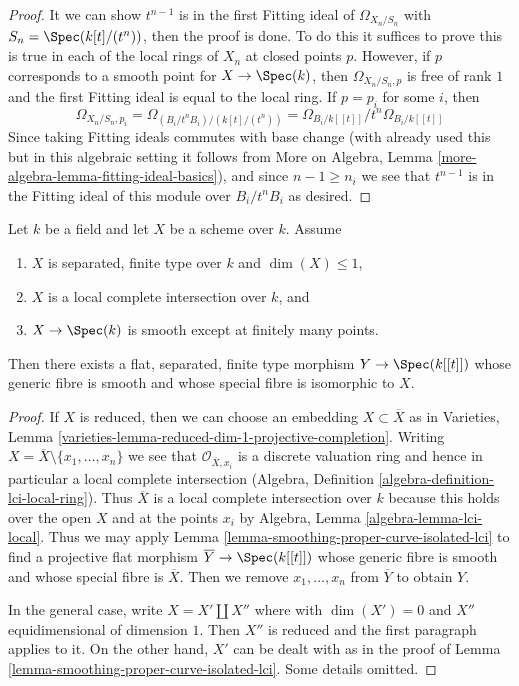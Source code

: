 \begin{proof}
It we can show $t^{n - 1}$ is in the first Fitting ideal of
$\Omega_{X_n/S_n}$ with $S_n = \Spec(k[t]/(t^n))$, then the proof is done.
To do this it suffices to prove this is true in each of
the local rings of $X_n$ at closed points $p$.
However, if $p$ corresponds to a smooth point for $X \to \Spec(k)$,
then $\Omega_{X_n/S_n, p}$ is free of rank $1$ and the first Fitting
ideal is equal to the local ring. If $p = p_i$ for some $i$, then
$$
\Omega_{X_n/S_n, p_i} =
\Omega_{(B_i/t^nB_i)/(k[t]/(t^n))} =
\Omega_{B_i/k[[t]]}/t^n\Omega_{B_i/k[[t]]}
$$
Since taking Fitting ideals commutes with base change
(with already used this but in this algebraic setting
it follows from More on Algebra, Lemma
\ref{more-algebra-lemma-fitting-ideal-basics}),
and since $n - 1 \geq n_i$ we see that $t^{n - 1}$ is
in the Fitting ideal of this module over $B_i/t^nB_i$ as desired.
\end{proof}

\begin{lemma}
\label{lemma-smoothing-curve-isolated-lci}
Let $k$ be a field and let $X$ be a scheme over $k$. Assume
\begin{enumerate}
\item $X$ is separated, finite type over $k$ and $\dim(X) \leq 1$,
\item $X$ is a local complete intersection over $k$, and
\item $X \to \Spec(k)$ is smooth except at finitely many points.
\end{enumerate}
Then there exists a flat, separated, finite type morphism $Y \to \Spec(k[[t]])$
whose generic fibre is smooth and whose special fibre is
isomorphic to $X$.
\end{lemma}

\begin{proof}
If $X$ is reduced, then we can choose an embedding
$X \subset \overline{X}$ as in
Varieties, Lemma \ref{varieties-lemma-reduced-dim-1-projective-completion}.
Writing $X = \overline{X} \setminus \{x_1, \ldots, x_n\}$
we see that $\mathcal{O}_{\overline{X}, x_i}$ is a discrete
valuation ring and hence in particular a local complete intersection
(Algebra, Definition \ref{algebra-definition-lci-local-ring}).
Thus $\overline{X}$ is a local complete intersection
over $k$ because this holds over the open $X$ and
at the points $x_i$ by Algebra, Lemma \ref{algebra-lemma-lci-local}.
Thus we may apply Lemma \ref{lemma-smoothing-proper-curve-isolated-lci}
to find a projective flat morphism $\overline{Y} \to \Spec(k[[t]])$
whose generic fibre is smooth and whose special fibre
is $\overline{X}$. Then we remove $x_1, \ldots, x_n$
from $\overline{Y}$ to obtain $Y$.

\medskip\noindent
In the general case, write $X = X' \amalg X''$ where
with $\dim(X') = 0$ and $X''$ equidimensional of dimension $1$.
Then $X''$ is reduced and the first paragraph applies to it.
On the other hand, $X'$ can be dealt with
as in the proof of Lemma \ref{lemma-smoothing-proper-curve-isolated-lci}.
Some details omitted.
\end{proof}











